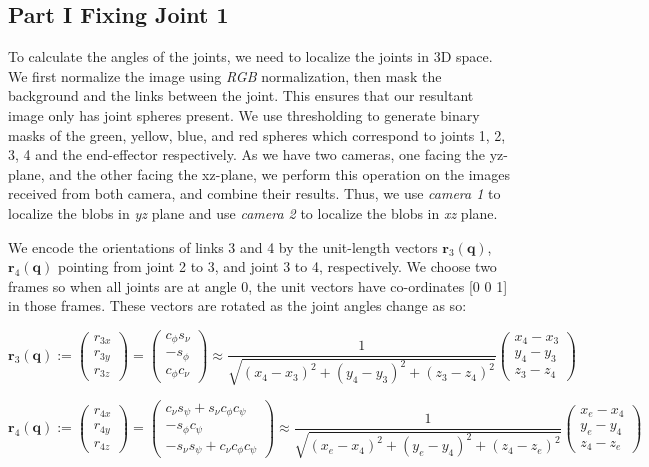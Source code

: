 \documentclass[11pt, a4paper]{article}
\begin{document}
    \subsection{Part I \textemdash Fixing Joint 1}
    To calculate the angles of the joints, we need to localize the joints in 3D space. We first normalize the image using \textit{RGB} normalization, then mask the background and the links between the joint. This ensures that our resultant image only has joint spheres present. We use thresholding to generate binary masks of the green, yellow, blue, and red spheres which correspond to joints 1, 2, 3, 4 and 
    the end-effector respectively. As we have two cameras, one facing
    the yz-plane, and the other facing the xz-plane, we perform this
    operation on the images received from both camera, and combine their
    results. Thus, we use \textit{camera 1} to localize the blobs in \textit{yz} plane and use \textit{camera 2} to localize the blobs in \textit{xz} plane.

    We encode the orientations of links 3 and 4 by
    the unit-length vectors $\textbf{r}_3(\textbf{q})$,
    $\textbf{r}_4(\textbf{q})$ pointing from
    joint 2 to 3, and joint 3 to 4, respectively. We choose two frames so when all joints are at angle 0, the unit vectors have co-ordinates [0 0 1] in those frames.  
    These vectors are rotated as the joint angles change as so:


    $$
    \textbf{r}_3(\textbf{q}) :=
    \begin{pmatrix}
        r_{3x}\\
        r_{3y}\\
        r_{3z}
    \end{pmatrix} =
    \begin{pmatrix}
        c_{\phi}s_{\nu}\\
       -s_{\phi}\\
        c_{\phi}c_{\nu}
    \end{pmatrix} \approx \frac{1}{\sqrt{(x_4 - x_3)^2 + (y_4 - y_3)^2 + (z_3 - z_4)^2}}
    \begin{pmatrix}
        x_4 - x_3\\
        y_4 - y_3\\
        z_3 - z_4
    \end{pmatrix}
    $$

    $$
    \textbf{r}_4(\textbf{q}) :=
    \begin{pmatrix}
        r_{4x}\\
        r_{4y}\\
        r_{4z}
    \end{pmatrix} =
    \begin{pmatrix}
        c_{\nu}s_{\psi} + s_{\nu}c_{\phi}c_{\psi}\\
       -s_{\phi}c_{\psi}\\
       -s_{\nu}s_{\psi} + c_{\nu}c_{\phi}c_{\psi}
    \end{pmatrix} \approx \frac{1}{\sqrt{(x_e - x_4)^2 + (y_e - y_4)^2 + (z_4 - z_e)^2}}
    \begin{pmatrix}
        x_e - x_4\\
        y_e - y_4\\
        z_4 - z_e
    \end{pmatrix}
    $$
\end{document}
